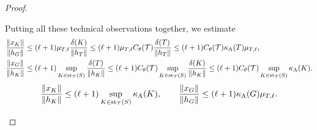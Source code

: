 \documentclass[10pt,a4paper]{article}
\begin{document}
\begin{proof}
\begin{itemize}
        Putting all these technical observations together, we estimate 
        \begin{align*}
            \frac{ \| x_{K} \| }{ \| h_{{G}} \| }
            &\leq 
            (\ell+1)\mu_{T,\ell}
            \frac{ \diam(K) }{ \| h_{T} \| }
            \leq 
            (\ell+1)\mu_{T,\ell}
            \diameterratio(\calT)
            \frac{ \diam(T) }{ \| h_{T} \| }
            \leq 
            (\ell+1)
            \diameterratio(\calT)
            \aspectratio(T) %
            \mu_{T,\ell}
            ,
            \\
            \frac{ \| x_{G} \| }{ \| h_{K} \| }
            &\leq 
            (\ell+1)
            \sup_{ K \in \patch_{\calT}(S) }
            \frac{ \diam(T) }{ \| h_{K} \| }
            \leq 
            (\ell+1)
            \diameterratio(\calT)
            \sup_{ K \in \patch_{\calT}(S) }
            \frac{ \diam(K) }{ \| h_{K} \| }
            \leq 
            (\ell+1)
            \diameterratio(\calT)
            \sup_{ K \in \patch_{\calT}(S) }
            \aspectratio(K) %
            .
        \end{align*}
        \begin{gather*}
            \frac{ \| x_{K} \| }{ \| h_{{K}} \| }
            \leq 
            (\ell+1)
            \sup_{ K \in \patch_{\calT}(S) }
            \aspectratio(K) %
            ,
            \qquad 
            \frac{ \| x_{G} \| }{ \| h_{G} \| }
            \leq 
            (\ell+1)
            \aspectratio({G}) \mu_{T,\ell} %
            .
        \end{gather*}

        
        

\end{itemize}
\end{proof}
\end{document}
